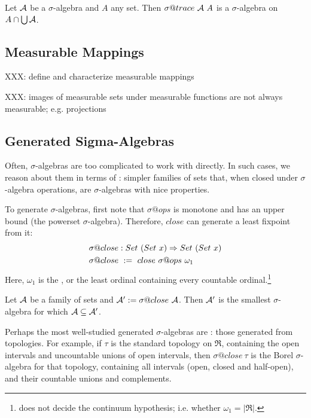 \documentclass[preprint]{sigplanconf}
\begin{document}
\begin{lemma}
Let $\mathcal{A}$ be a $\sigma$-algebra and $A$ any set.
Then $\sigma@trace~\A~A$ is a $\sigma$-algebra on $A \cap \textstyle\bigcup\mathcal{A}$.
\end{lemma}

\subsection{Measurable Mappings}

XXX: define and characterize measurable mappings

XXX: images of measurable sets under measurable functions are not always measurable; e.g. projections

\subsection{Generated Sigma-Algebras}

Often, $\sigma$-algebras are too complicated to work with directly.
In such cases, we reason about them in terms of : simpler families of sets that, when closed under $\sigma$-algebra operations, are $\sigma$-algebras with nice properties.

To generate $\sigma$-algebras, first note that $\sigma@ops$ is monotone and has an upper bound (the powerset $\sigma$-algebra).
Therefore, $close$ can generate a least fixpoint from it:
\begin{equation}
\begin{aligned}
	&\sigma@close : Set~(Set~x) \tto Set~(Set~x) \\
	&\sigma@close \ := \ close~\sigma@ops~\omega_1
\end{aligned}
\end{equation}
Here, $\omega_1$ is the , or the least ordinal containing every countable ordinal.\footnote{\lzfclang does not decide the continuum hypothesis; i.e. whether $\omega_1 = |\Re|$.}

\begin{lemma}
Let $\mathcal{A}$ be a family of sets and $\A' := \sigma@close~\A$.
Then $\mathcal{A}'$ is the smallest $\sigma$-algebra for which $\mathcal{A} \subseteq \mathcal{A}'$.
\label{lem:generated-sigma-algebra}
\end{lemma}

Perhaps the most well-studied generated $\sigma$-algebras are : those generated from topologies.
For example, if $\tau$ is the standard topology on $\Re$, containing the open intervals and uncountable unions of open intervals, then $\sigma@close~\tau$ is the Borel $\sigma$-algebra for that topology, containing all intervals (open, closed and half-open), and their countable unions and complements.
\end{document}
